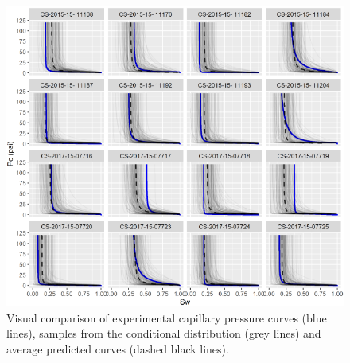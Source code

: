 \documentclass[english,msc,numbers]{coppe}
\begin{document}
  \begin{figure}
  
  {\centering \includegraphics[width=0.9\linewidth]{figure/4-3-pcc-posterior-sample} 
  
  }
  
  \caption{Visual comparison of experimental capillary pressure curves (blue lines), samples from the conditional distribution (grey lines) and average predicted curves (dashed black lines).}\label{fig:pcc-posterior-sample}
  \end{figure}
  \par
  
\end{document}
